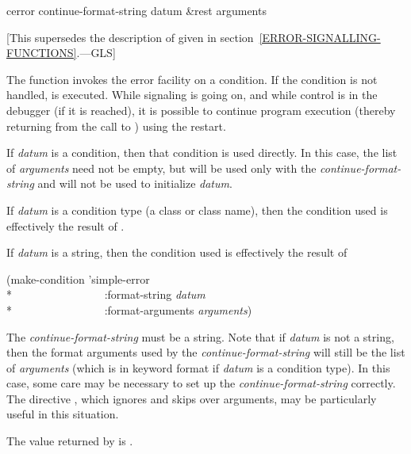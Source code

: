 \begin{defun}[Function]
cerror continue-format-string datum &rest arguments

   [This supersedes the description of 
   given in section~\ref{ERROR-SIGNALLING-FUNCTIONS}.---GLS]

  The function 
  invokes the error facility on a condition. If the condition is not handled,
   is executed. While signaling is going on,
  and
  while control is in the debugger (if it is reached), it is possible to continue
  program execution (thereby returning from the call to )
  using the  restart.

  If {\it datum} is a condition, then that condition is used directly. 
  In this case, the list of {\it arguments} need not be empty,
  but will be used only with the {\it continue-format-string}
  and will not be used to initialize {\it datum}.

  If {\it datum} is a condition type (a class or class name), then the condition used is effectively the result
  of .

  If {\it datum} is a string, then the condition used is effectively the result of
\begin{lisp}
(make-condition 'simple-error \\*
~~~~~~~~~~~~~~~~:format-string {\it datum} \\*
~~~~~~~~~~~~~~~~:format-arguments {\it arguments})
\end{lisp}

  The {\it continue-format-string} must be a string.
  Note that if {\it datum} is not a 
  string, then the format arguments used by the {\it continue-format-string} will
  still be the list of {\it arguments} (which is in keyword format if {\it datum} is a condition
  type). In this case, some care may be necessary to set up the
  {\it continue-format-string} correctly. The  directive \cd{{\Xtilde}*},
  which ignores and skips over  arguments,
  may be particularly 
  useful in this situation.

  The value returned by  is .
\end{defun}

